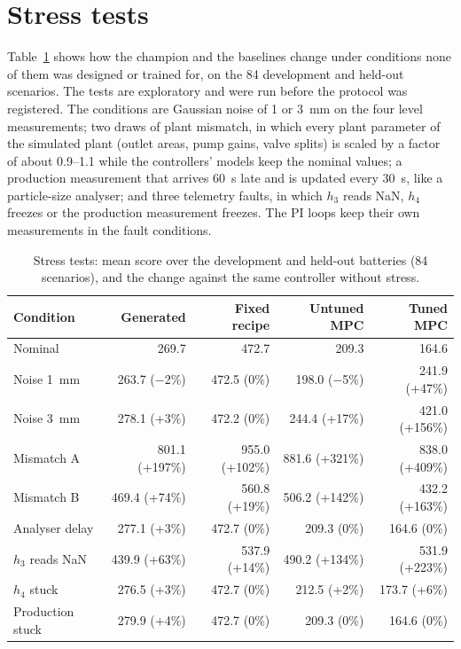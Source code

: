\section{Stress tests}
\label{sec:coord-stress}
Table~\ref{tab:coord-stress} shows how the champion and the baselines change
under conditions none of them was designed or trained for, on the 84
development and held-out scenarios. The tests are exploratory and were run
before the protocol was registered. The conditions are Gaussian noise of 1
or 3~mm on the four level measurements; two draws of plant mismatch, in
which every plant parameter of the simulated plant (outlet areas, pump gains,
valve splits) is scaled by a factor of about 0.9--1.1 while the controllers'
models keep the nominal values; a production measurement that arrives 60~s
late and is updated every 30~s, like a particle-size analyser; and three
telemetry faults, in which $h_3$ reads NaN, $h_4$ freezes or the production
measurement freezes. The PI loops keep their own measurements in the fault
conditions.

\begin{table}[tb]
  \centering
  \caption{Stress tests: mean score over the development and held-out
    batteries (84 scenarios), and the change against the same controller
    without stress.}
  \label{tab:coord-stress}
  \small\setlength{\tabcolsep}{3pt}
  \begin{tabular}{@{}lrrrr@{}}
    \toprule
    Condition & Generated & Fixed recipe & Untuned MPC & Tuned MPC \\
    \midrule
    Nominal             & 269.7          & 472.7          & 209.3          & 164.6 \\
    Noise 1~mm          & 263.7 ($-$2\%)   & 472.5 (0\%)    & 198.0 ($-$5\%)   & 241.9 (+47\%) \\
    Noise 3~mm          & 278.1 (+3\%)   & 472.2 (0\%)    & 244.4 (+17\%)  & 421.0 (+156\%) \\
    Mismatch A          & 801.1 (+197\%) & 955.0 (+102\%) & 881.6 (+321\%) & 838.0 (+409\%) \\
    Mismatch B          & 469.4 (+74\%)  & 560.8 (+19\%)  & 506.2 (+142\%) & 432.2 (+163\%) \\
    Analyser delay      & 277.1 (+3\%)   & 472.7 (0\%)    & 209.3 (0\%)    & 164.6 (0\%) \\
    $h_3$ reads NaN     & 439.9 (+63\%)  & 537.9 (+14\%)  & 490.2 (+134\%) & 531.9 (+223\%) \\
    $h_4$ stuck         & 276.5 (+3\%)   & 472.7 (0\%)    & 212.5 (+2\%)   & 173.7 (+6\%) \\
    Production stuck    & 279.9 (+4\%)   & 472.7 (0\%)    & 209.3 (0\%)    & 164.6 (0\%) \\
    \bottomrule
  \end{tabular}
\end{table}

